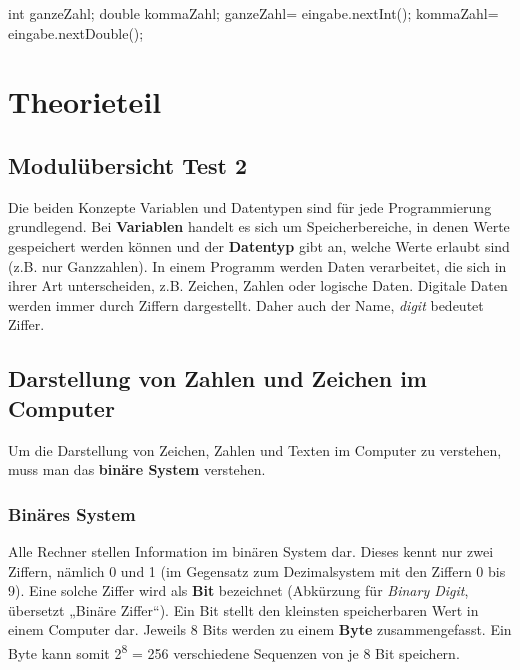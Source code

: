 \documentclass[10pt,paper=17cm:22cm, twoside=true, DIV=14]{scrbook}
\newenvironment {Shaded}
        {\begin{mdframed}[style=code] }
         {\end{mdframed}}
\newcommand{\DataTypeTok}[1]{\textcolor[rgb]{0.56,0.13,0.00}{{#1}}}
\newcommand{\FunctionTok}[1]{\textcolor[rgb]{0.02,0.16,0.49}{{#1}}}
\newcommand{\NormalTok}[1]{{#1}}
\begin{document}
\begin{Shaded}
\begin{Highlighting}[]
\DataTypeTok{int} \NormalTok{ganzeZahl;}
\DataTypeTok{double} \NormalTok{kommaZahl;}
\NormalTok{ganzeZahl= eingabe.}\FunctionTok{nextInt}\NormalTok{();}
\NormalTok{kommaZahl= eingabe.}\FunctionTok{nextDouble}\NormalTok{();}
\end{Highlighting}
\end{Shaded}

\clearpage \begingroup \let\clearpage\relax \let\cleardoublepage\relax \chapter{ Theorieteil } \endgroup 

\section{Modulübersicht Test 2}\label{modulubersicht-test-2-1}

Die beiden Konzepte Variablen und Datentypen sind für jede
Programmierung grundlegend. Bei \textbf{Variablen} handelt es sich um
Speicherbereiche, in denen Werte gespeichert werden können und der
\textbf{Datentyp} gibt an, welche Werte erlaubt sind (z.B. nur
Ganzzahlen). In einem Programm werden Daten verarbeitet, die sich in
ihrer Art unterscheiden, z.B. Zeichen, Zahlen oder logische Daten.
Digitale Daten werden immer durch Ziffern dargestellt. Daher auch der
Name, \emph{digit} bedeutet Ziffer.

\section{Darstellung von Zahlen und Zeichen im
Computer}\label{darstellung-von-zahlen-und-zeichen-im-computer-1}

Um die Darstellung von Zeichen, Zahlen und Texten im Computer zu
verstehen, muss man das \textbf{binäre System} verstehen.

\subsection{Binäres System}\label{binares-system-1}

Alle Rechner stellen Information im binären System dar. Dieses kennt nur
zwei Ziffern, nämlich 0 und 1 (im Gegensatz zum Dezimalsystem mit den
Ziffern 0 bis 9). Eine solche Ziffer wird als \textbf{Bit} bezeichnet
(Abkürzung für \emph{Binary Digit}, übersetzt „Binäre Ziffer``). Ein Bit
stellt den kleinsten speicherbaren Wert in einem Computer dar. Jeweils 8
Bits werden zu einem \textbf{Byte} zusammengefasst. Ein Byte kann somit
2\textsuperscript{8} = 256 verschiedene Sequenzen von je 8 Bit
speichern.
\end{document}
